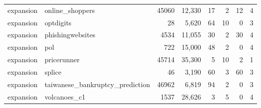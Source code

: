 \begin{longtable}{llrrrrrc}
expansion & online\_shoppers & 45060 & 12{,}330 & 17 & 2 & 12 & 4 \\
expansion & optdigits & 28 & 5{,}620 & 64 & 10 & 0 & 3 \\
expansion & phishingwebsites & 4534 & 11{,}055 & 30 & 2 & 30 & 4 \\
expansion & pol & 722 & 15{,}000 & 48 & 2 & 0 & 4 \\
expansion & pricerunner & 45714 & 35{,}300 & 5 & 10 & 2 & 1 \\
expansion & splice & 46 & 3{,}190 & 60 & 3 & 60 & 3 \\
expansion & taiwanese\_bankruptcy\_prediction & 46962 & 6{,}819 & 94 & 2 & 0 & 3 \\
expansion & volcanoes\_c1 & 1537 & 28{,}626 & 3 & 5 & 0 & 4 \\
\end{longtable}
